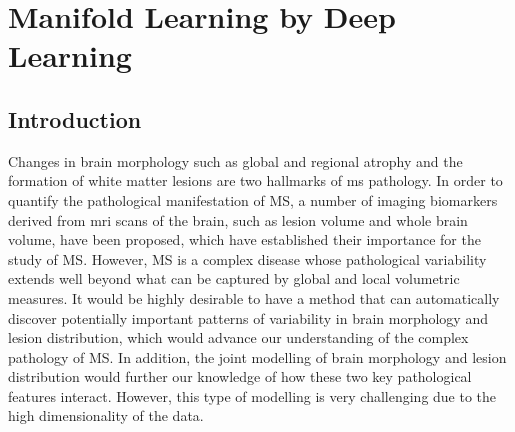 \chapter{Manifold Learning by Deep Learning}
\label{sec:manifold}

\section{Introduction}

Changes in brain morphology such as global and regional atrophy and the
formation of white matter lesions are two hallmarks of \gls{ms} pathology. In
order to quantify the pathological manifestation of MS, a number of imaging
biomarkers derived from \gls{mri} scans of the brain, such as lesion volume and
whole brain volume, have been proposed, which have established their importance
for the study of MS. However, MS is a complex disease whose pathological
variability extends well beyond what can be captured by global and local
volumetric measures. It would be highly desirable to have a method that can
automatically discover potentially important patterns of variability in brain
morphology and lesion distribution, which would advance our understanding of the
complex pathology of MS. In addition, the joint modelling of brain morphology and
lesion distribution would further our knowledge of how these two key
pathological features interact. However, this type of modelling is very
challenging due to the high dimensionality of the data.

